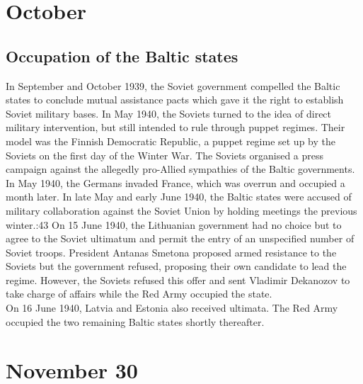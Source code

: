 \documentclass[11pt]{report}
\begin{document}
\section{October}
\subsection{Occupation of the Baltic states}
In September and October 1939, the Soviet government compelled the Baltic states to conclude mutual assistance pacts which gave it the right to establish Soviet military bases. In May 1940, the Soviets turned to the idea of direct military intervention, but still intended to rule through puppet regimes. Their model was the Finnish Democratic Republic, a puppet regime set up by the Soviets on the first day of the Winter War. The Soviets organised a press campaign against the allegedly pro-Allied sympathies of the Baltic governments. In May 1940, the Germans invaded France, which was overrun and occupied a month later. In late May and early June 1940, the Baltic states were accused of military collaboration against the Soviet Union by holding meetings the previous winter.:43 On 15 June 1940, the Lithuanian government had no choice but to agree to the Soviet ultimatum and permit the entry of an unspecified number of Soviet troops. President Antanas Smetona proposed armed resistance to the Soviets but the government refused, proposing their own candidate to lead the regime. However, the Soviets refused this offer and sent Vladimir Dekanozov to take charge of affairs while the Red Army occupied the state.\\ \indent On 16 June 1940, Latvia and Estonia also received ultimata. The Red Army occupied the two remaining Baltic states shortly thereafter.
\section{November 30}
\end{document}
